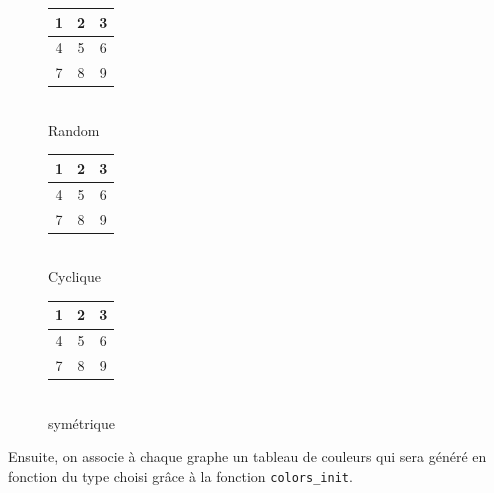 \documentclass[11pt]{article}
\begin{document}
\begin{figure}[h!]
    \centering
    \begin{minipage}[c]{.2\linewidth}
        \begin{tabular}{|c|c|c|}
            \hline
            1\cellcolor{blue} & 2\cellcolor{yellow} & 3\cellcolor{green}  \\
            \hline
            4\cellcolor{blue} & 5\cellcolor{red} & 6\cellcolor{cyan}  \\
            \hline
            7\cellcolor{cyan} & 8\cellcolor{green} & 9\cellcolor{green}  \\    
            \hline
        \end{tabular}
        \caption{\\Random}
    \end{minipage}
    \begin{minipage}[c]{.2\linewidth}
        \begin{tabular}{|c|c|c|}
            \hline
            1\cellcolor{blue} & 2\cellcolor{red} & 3\cellcolor{green}  \\
            \hline
            4\cellcolor{yellow} & 5\cellcolor{magenta} & 6\cellcolor{cyan}  \\
            \hline
            7\cellcolor{blue} & 8\cellcolor{red} & 9\cellcolor{green}  \\    
            \hline
        \end{tabular}
        \caption{\\Cyclique}
    \end{minipage}
    \begin{minipage}[c]{.2\linewidth}
        \begin{tabular}{|c|c|c|}
        \hline
        1\cellcolor{blue} & 2\cellcolor{red} & 3\cellcolor{green}  \\
        \hline
        4\cellcolor{red} & 5\cellcolor{green} & 6\cellcolor{red}  \\
        \hline
        7\cellcolor{green} & 8\cellcolor{red} & 9\cellcolor{blue}  \\    
        \hline
        \end{tabular}
        \caption{\\symétrique}
    \end{minipage}
\end{figure}
\newline
Ensuite, on associe à chaque graphe un tableau de couleurs qui sera généré en fonction du type choisi grâce à la fonction \texttt{colors\_init}.
\end{document}
